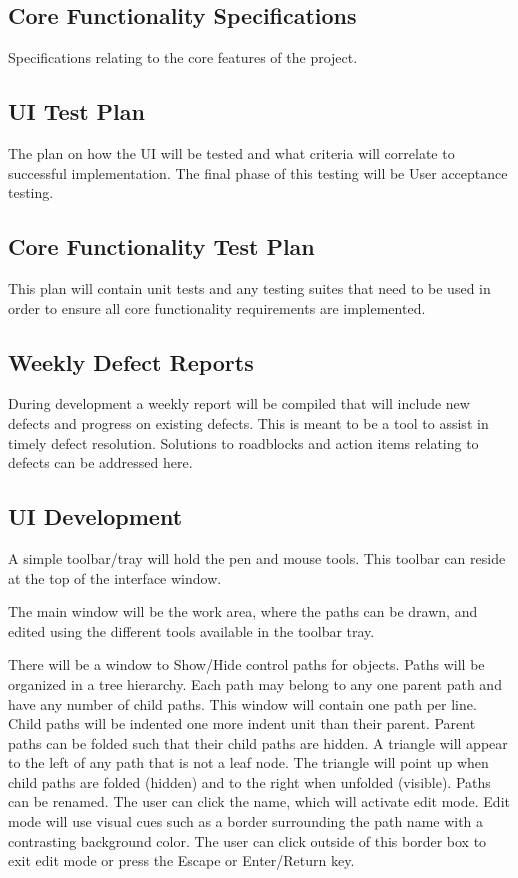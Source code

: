 \documentclass[12pt]{article}
\begin{document}
\subsection{Core Functionality Specifications}
Specifications relating to the core features of the project.

\subsection{UI Test Plan}
The plan on how the UI will be tested and what criteria will correlate to successful implementation. The final phase of this testing will be User acceptance testing.

\subsection{Core Functionality Test Plan}
This plan will contain unit tests and any testing suites that need to be used in order to ensure all core functionality requirements are implemented.

\subsection{Weekly Defect Reports}
During development a weekly report will be compiled that will include new defects and progress on existing defects. This is meant to be a tool to assist in timely defect resolution.  Solutions to roadblocks and action items relating to defects can be addressed here.

\subsection{UI Development}
A simple toolbar/tray will hold the pen and mouse tools. This toolbar can reside at the top of the interface window.

The main window will be the work area, where the paths can be drawn, and edited using the different tools available in the toolbar tray.

There will be a window to Show/Hide control paths for objects. Paths will be organized in a tree hierarchy. Each path may belong to any one parent path and have any number of child paths. This window will contain one path per line. Child paths will be indented one more indent unit than their parent. Parent paths can be folded such that their child paths are hidden. A triangle will appear to the left of any path that is not a leaf node. The triangle will point up when child paths are folded (hidden) and to the right when unfolded (visible). Paths can be renamed. The user can click the name, which will activate edit mode. Edit mode will use visual cues such as a border surrounding the path name with a contrasting background color. The user can click outside of this border box to exit edit mode or press the Escape or Enter/Return key.
\end{document}
